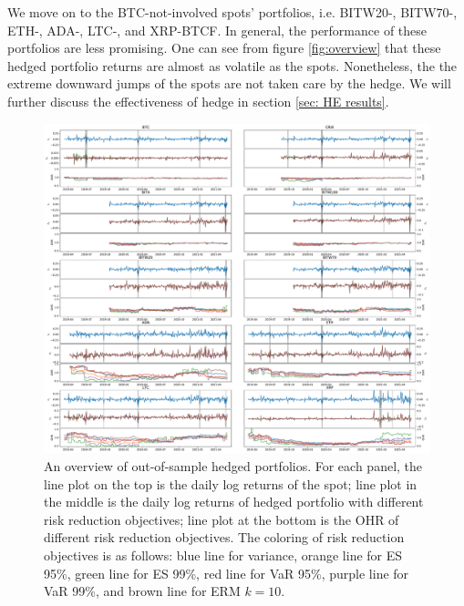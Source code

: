 We move on to the BTC-not-involved spots' portfolios, i.e. BITW20-, BITW70-, ETH-, ADA-, LTC-, and XRP-BTCF.
In general, the performance of these portfolios are less promising.
One can see from figure \ref{fig:overview} that these hedged portfolio returns are almost as volatile as the spots.
Nonetheless, the the extreme downward jumps of the spots are not taken care by the hedge.
We will further discuss the effectiveness of hedge in section \ref{sec: HE results}. \medskip

\begin{figure}[ht]
    \centering
    \includegraphics[width=\textwidth]{_pics/overview.pdf}
  \caption{An overview of out-of-sample hedged portfolios.
            For each panel, the line plot on the top is the daily log returns of the spot;
            line plot in the middle is the daily log returns of hedged portfolio with different risk reduction objectives;
            line plot at the bottom is the OHR of different risk reduction objectives. The coloring of risk reduction objectives is as follows:
                                      \textcolor{plt1}{blue line} for variance,
                                      \textcolor{plt2}{orange line} for ES 95\%,
                                      \textcolor{plt3}{green line} for ES 99\%,
                                      \textcolor{plt4}{red line} for VaR 95\%,
                                      \textcolor{plt5}{purple line} for VaR 99\%, and
                                      \textcolor{plt6}{brown line} for ERM $k=10$.
}
\end{figure}
